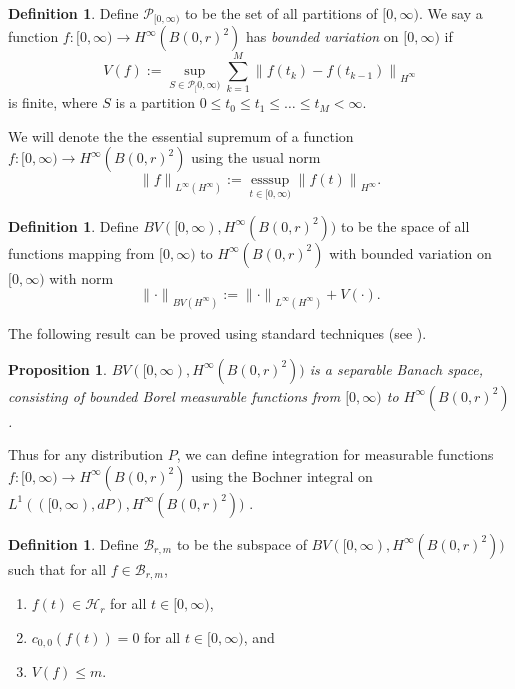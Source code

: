 \documentclass[12pt]{amsart}
\theoremstyle{plain}
\newtheorem{prop}[thm]{Proposition}
\theoremstyle{definition}
\newtheorem{defn}[thm]{Definition}
\theoremstyle{remark}
\theoremstyle{definition}
\begin{document}
\begin{defn}
Define $\mathcal{P}_{[0,\infty)}$ to be the set of all partitions of $[0,\infty)$. We say a function $f: [0,\infty) \to H^\infty(B(0,r)^2)$ has \emph{bounded variation} on $[0,\infty)$ if
\begin{equation}
V(f) :=\sup_{S \in \mathcal{P}_[0,\infty)}\sum_{k=1}^M {\|f(t_k)-f(t_{k-1})\|}_{H^\infty}
\end{equation}
is finite, where $S$ is a partition $0 \le t_0 \leq t_1 \leq \dots \leq t_M < \infty$.
\end{defn}

We will denote the the essential supremum of a function $f:[0,\infty) \to H^\infty(B(0,r)^2)$ using the usual norm
\begin{equation}
{\| f \|}_{L^\infty(H^\infty)} := \operatorname*{esssup}_{t\in [0,\infty)} {\|f(t)\|}_{H^\infty}.
\end{equation}

\begin{defn} \label{BV}
Define $BV([0,\infty),H^\infty(B(0,r)^2))$ to be the space of all functions mapping from $[0,\infty)$ to $H^\infty(B(0,r)^2)$ with bounded variation on $[0,\infty)$ with norm
\begin{equation}
{\| \cdot \|}_{BV(H^\infty)} := {\| \cdot \|}_{L^\infty(H^\infty)} + V(\cdot). \label{Brnorm}
\end{equation}
\end{defn}

The following result can be proved using standard techniques (see \cite{Oveys-thesis}).

\begin{prop}
$BV([0,\infty),H^\infty(B(0,r)^2))$ is a separable Banach space, consisting of bounded Borel measurable functions from $[0,\infty)$ to $H^\infty(B(0,r)^2)$.
\end{prop}

Thus for any distribution $P$, we can define integration for measurable functions $f:[0,\infty) \to H^\infty(B(0,r)^2)$ using the Bochner integral on $L^1(([0,\infty),dP),H^\infty(B(0,r)^2))$ \cite{diestel}.

\begin{defn}
Define $\mathcal{B}_{r,m}$ to be the subspace of $BV([0,\infty),H^\infty(B(0,r)^2))$ such that for all $f \in \mathcal{B}_{r,m}$,
\begin{enumerate}
\item $f(t) \in \mathcal{H}_r$ for all $t \in [0,\infty)$,
\item $c_{0,0}(f(t)) = 0$ for all $t \in [0,\infty)$, and
\item $V(f) \leq m$.
\end{enumerate}
\end{defn}
\end{document}
